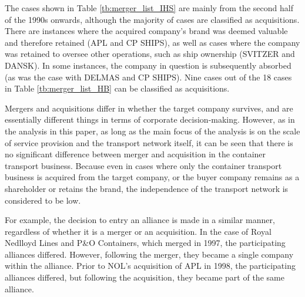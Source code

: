 \documentclass[10pt]{article}
\begin{document}
The cases shown in Table \ref{tb:merger_list_IHS} are mainly from the second half of the 1990s onwards, although the majority of cases are classified as acquisitions. There are instances where the acquired company's brand was deemed valuable and therefore retained (APL and CP SHIPS), as well as cases where the company was retained to oversee other operations, such as ship ownership (SVITZER and DANSK). In some instances, the company in question is subsequently absorbed (as was the case with DELMAS and CP SHIPS). Nine cases out of the 18 cases in Table \ref{tb:merger_list_HB} can be classified as acquisitions.

Mergers and acquisitions differ in whether the target company survives, and are essentially different things in terms of corporate decision-making. However, as in the analysis in this paper, as long as the main focus of the analysis is on the scale of service provision and the transport network itself, it can be seen that there is no significant difference between merger and acquisition in the container transport business. Because even in cases where only the container transport business is acquired from the target company, or the buyer company remains as a shareholder or retains the brand, the independence of the transport network is considered to be low.

For example, the decision to entry an alliance is made in a similar manner, regardless of whether it is a merger or an acquisition. In the case of Royal Nedlloyd Lines and P\&O Containers, which merged in 1997, the participating alliances differed. However, following the merger, they became a single company within the alliance. Prior to NOL's acquisition of APL in 1998, the participating alliances differed, but following the acquisition, they became part of the same alliance.
\end{document}
